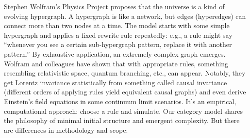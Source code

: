 \documentclass{article}
\begin{document}
Stephen Wolfram’s Physics Project proposes that the universe is a kind of evolving hypergraph\cite{wolfram2020}. A hypergraph is like a network, but edges (hyperedges) can connect more than two nodes at a time. The model starts with some simple hypergraph and applies a fixed rewrite rule repeatedly: e.g., a rule might say “whenever you see a certain sub-hypergraph pattern, replace it with another pattern.” By exhaustive application, an extremely complex graph emerges. Wolfram and colleagues have shown that with appropriate rules, something resembling relativistic space, quantum branching, etc., can appear. Notably, they get Lorentz invariance statistically from something called causal invariance (different orders of applying rules yield equivalent causal graphs) and even derive Einstein’s field equations in some continuum limit scenarios. It’s an empirical, computational approach: choose a rule and simulate. Our category model shares the philosophy of minimal initial structure and emergent complexity\cite{wolfram2020}. But there are differences in methodology and scope:
\end{document}
